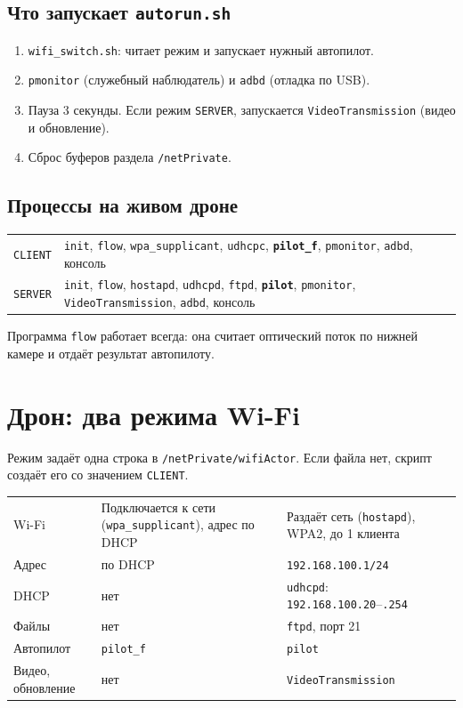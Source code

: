 \subsection*{Что запускает \texttt{autorun.sh}}
\begin{enumerate}
  \item \texttt{wifi\_switch.sh}: читает режим и запускает нужный автопилот.
  \item \texttt{pmonitor} (служебный наблюдатель) и \texttt{adbd} (отладка по USB).
  \item Пауза 3 секунды. Если режим \texttt{SERVER}, запускается \texttt{VideoTransmission} (видео и обновление).
  \item Сброс буферов раздела \texttt{/netPrivate}.
\end{enumerate}

\subsection*{Процессы на живом дроне}

\begin{tabularx}{\textwidth}{@{}l Y@{}}
\toprule
{} &  \\ \midrule
\texttt{CLIENT} & \texttt{init}, \texttt{flow}, \texttt{wpa\_supplicant}, \texttt{udhcpc}, \textbf{\texttt{pilot\_f}}, \texttt{pmonitor}, \texttt{adbd}, консоль \\
\texttt{SERVER} & \texttt{init}, \texttt{flow}, \texttt{hostapd}, \texttt{udhcpd}, \texttt{ftpd}, \textbf{\texttt{pilot}}, \texttt{pmonitor}, \texttt{VideoTransmission}, \texttt{adbd}, консоль \\ \bottomrule
\end{tabularx}

\vspace{4pt}
\pr{} Программа \texttt{flow} работает всегда: она считает оптический поток по нижней камере и отдаёт результат автопилоту.

\section{Дрон: два режима Wi-Fi}

Режим задаёт одна строка в \texttt{/netPrivate/wifiActor}. Если файла нет, скрипт создаёт его со значением \texttt{CLIENT}. \pr{}

\begin{tabularx}{\textwidth}{@{}p{2.8cm} Y Y@{}}
\toprule
&  &  \\ \midrule
Wi-Fi & Подключается к сети (\texttt{wpa\_supplicant}), адрес по DHCP & Раздаёт сеть (\texttt{hostapd}), WPA2, до 1 клиента \\
Адрес & по DHCP & \texttt{192.168.100.1/24} \\
DHCP & нет & \texttt{udhcpd}: \texttt{192.168.100.20}--\texttt{.254} \\
Файлы & нет & \texttt{ftpd}, порт 21 \\
Автопилот & \texttt{pilot\_f} & \texttt{pilot} \\
Видео, обновление & нет & \texttt{VideoTransmission} \\ \bottomrule
\end{tabularx}

